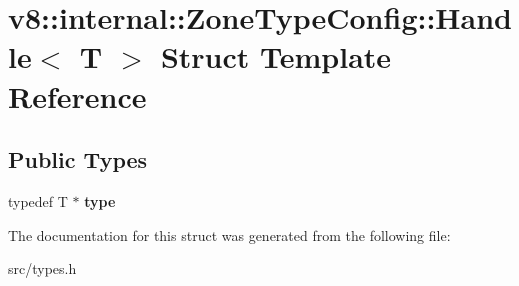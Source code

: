 \hypertarget{structv8_1_1internal_1_1_zone_type_config_1_1_handle}{}\section{v8\+:\+:internal\+:\+:Zone\+Type\+Config\+:\+:Handle$<$ T $>$ Struct Template Reference}
\label{structv8_1_1internal_1_1_zone_type_config_1_1_handle}
\subsection*{Public Types}
\begin{DoxyCompactItemize}
\item 
\hypertarget{structv8_1_1internal_1_1_zone_type_config_1_1_handle_aa9685527ed78cebcf22caf755603cd1c}{}typedef T $\ast$ {\bfseries type}\label{structv8_1_1internal_1_1_zone_type_config_1_1_handle_aa9685527ed78cebcf22caf755603cd1c}

\end{DoxyCompactItemize}


The documentation for this struct was generated from the following file\+:\begin{DoxyCompactItemize}
\item 
src/types.\+h\end{DoxyCompactItemize}
